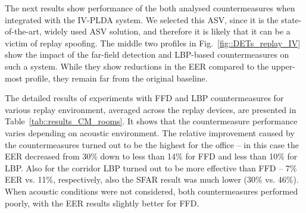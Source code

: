 
The next results show performance of the both analysed countermeasures when integrated with the IV-PLDA system. We selected this ASV, since it is the state-of-the-art, widely used ASV solution, and therefore it is likely that it can be a victim of replay spoofing. The middle two profiles in Fig.~\ref{fig::DETs_replay_IV} show the impact of the far-field detection and LBP-based countermeasures on such a system. While they show reductions in the EER compared to the upper-most profile, they remain far from the original baseline.





The detailed results of experiments with FFD and LBP countermeasures for various replay environment, averaged across the replay devices, are presented in Table~\ref{tab::results_CM_rooms}. It shows that the countermeasure performance varies depending on acoustic environment. The relative improvement caused by the countermeasures turned out to be the highest for the office -- in this case the EER decreased from 30\% down to less than 14\% for FFD and less than 10\% for LBP. Also for the corridor LBP turned out to be more effective than FFD -- 7\% EER vs. 11\%, respectively, also the SFAR result was much lower (30\% vs. 46\%). When acoustic conditions were not considered, both countermeasures performed poorly, with the EER results slightly better for FFD. 




